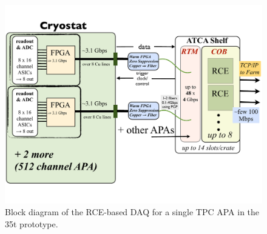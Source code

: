 


\begin{figure}[hp]
\includegraphics[scale=0.6,angle=90]{LBNE-DAQ-BlockDiagram-35t.pdf}
\caption{Block diagram of the RCE-based DAQ for a single TPC APA in the 35t prototype.}
\label{fig:blockDiag}
\end{figure} 
\clearpage

